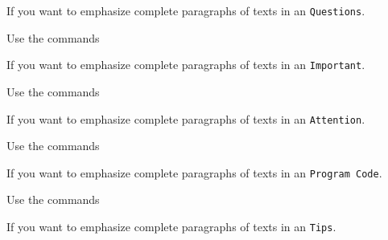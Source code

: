 \documentclass[graybox,square]{svmono}
\begin{document}
\begin{sloppy}
If you want to emphasize complete paragraphs of texts in an \verb|Questions|.  

Use the commands

\cprotect{}

If you want to emphasize complete paragraphs of texts in an \verb|Important|.  

Use the commands

\cprotect{}

If you want to emphasize complete paragraphs of texts in an \verb|Attention|.  

Use the commands

\cprotect{}

If you want to emphasize complete paragraphs of texts in an \verb|Program Code|.  

Use the commands

\cprotect{}

If you want to emphasize complete paragraphs of texts in an \verb|Tips|.  




\end{sloppy}
\end{document}

